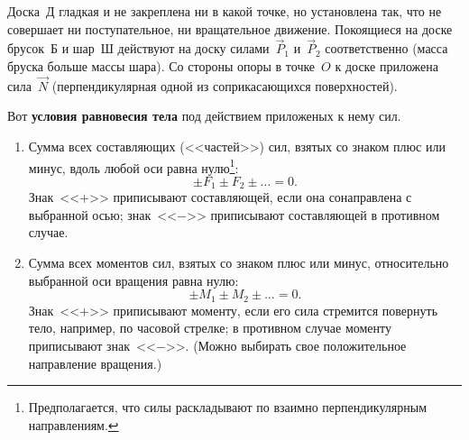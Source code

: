 \documentclass[main.tex]{subfiles}
\begin{document}











Доска~Д гладкая и не закреплена ни в какой точке, но установлена так, что не совершает ни поступательное, ни вращательное движение. Покоящиеся на доске брусок~Б и шар~Ш действуют на доску силами~$\vec P_1$ и~$\vec P_2$ соответственно (масса бруска больше массы шара). Со стороны опоры в точке~$O$ к доске приложена сила~$\vec N$ (перпендикулярная одной из соприкасающихся поверхностей).

Вот \textbf{условия равновесия тела} под действием приложеных к нему сил.
\begin{enumerate}
    \item Сумма всех составляющих (<<частей>>) сил, взятых со знаком плюс или минус, вдоль любой оси равна нулю\footnote{Предполагается, что силы раскладывают по взаимно перпендикулярным направлениям.}:
    \begin{equation}\label{e12}
        \pm F_1\pm F_2\pm\ldots =0.
    \end{equation}
    Знак~<<$+$>> приписывают составляющей, если она сонаправлена с выбранной осью; знак~<<$-$>> приписывают составляющей в противном случае.
    
    \item Сумма всех моментов сил, взятых со знаком плюс или минус, относительно выбранной оси вращения равна нулю:
    \begin{equation}\label{e13}
        \pm M_1\pm M_2\pm\ldots =0.
    \end{equation}
    Знак~<<$+$>> приписывают моменту, если его сила стремится повернуть тело, например, по часовой стрелке; в противном случае моменту приписывают знак~<<$-$>>. (Можно выбирать свое положительное направление вращения.)
\end{enumerate}
\end{document}
